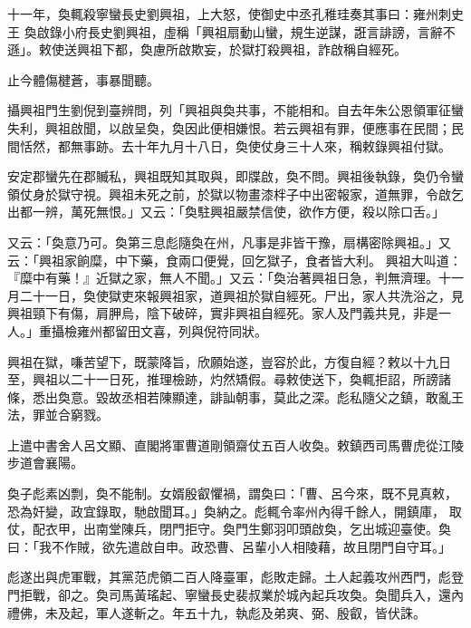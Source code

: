 \begin{pinyinscope}
 十一年，奐輒殺寧蠻長史劉興祖，上大怒，使御史中丞孔稚珪奏其事曰：雍州刺史王
 奐啟錄小府長史劉興祖，虛稱「興祖扇動山蠻，規生逆謀，誑言誹謗，言辭不遜」。敕使送興祖下都，奐慮所啟欺妄，於獄打殺興祖，詐啟稱自經死。



 止今體傷楗蒼，事暴聞聽。



 攝興祖門生劉倪到臺辨問，列「興祖與奐共事，不能相和。自去年朱公恩領軍征蠻失利，興祖啟聞，以啟呈奐，奐因此便相嫌恨。若云興祖有罪，便應事在民間；民間恬然，都無事跡。去十年九月十八日，奐使仗身三十人來，稱敕錄興祖付獄。



 安定郡蠻先在郡贓私，興祖既知其取與，即牒啟，奐不問。興祖後執錄，奐仍令蠻領仗身於獄守視。興祖未死之前，於獄以物畫漆柈子中出密報家，道無罪，令啟乞出都一辨，萬死無恨。」又云：「奐駐興祖嚴禁信使，欲作方便，殺以除口舌。」



 又云：「奐意乃可。奐第三息彪隨奐在州，凡事是非皆干豫，扇構密除興祖。」又云：「興祖家餉糜，中下藥，食兩口便覺，回乞獄子，食者皆大利。
 興祖大叫道：『糜中有藥！』近獄之家，無人不聞。」又云：「奐治著興祖日急，判無濟理。十一月二十一日，奐使獄吏來報興祖家，道興祖於獄自經死。尸出，家人共洗浴之，見興祖頸下有傷，肩胛烏，陰下破碎，實非興祖自經死。家人及門義共見，非是一人。」重攝檢雍州都留田文喜，列與倪符同狀。



 興祖在獄，嗛苦望下，既蒙降旨，欣願始遂，豈容於此，方復自經？敕以十九日至，興祖以二十一日死，推理檢跡，灼然矯假。尋敕使送下，奐輒拒詔，所謗諸條，悉出奐意。毀故丞相若陳顯達，誹訕朝事，莫此之深。彪私隨父之鎮，敢亂王法，罪並合窮戮。



 上遣中書舍人呂文顯、直閣將軍曹道剛領齋仗五百人收奐。敕鎮西司馬曹虎從江陵步道會襄陽。



 奐子彪素凶剽，奐不能制。女婿殷叡懼禍，謂奐曰：「曹、呂今來，既不見真敕，恐為奸變，政宜錄取，馳啟聞耳。」奐納之。彪輒令率州內得千餘人，開鎮庫，
 取仗，配衣甲，出南堂陳兵，閉門拒守。奐門生鄭羽叩頭啟奐，乞出城迎臺使。奐曰：「我不作賊，欲先遣啟自申。政恐曹、呂輩小人相陵藉，故且閉門自守耳。」



 彪遂出與虎軍戰，其黨范虎領二百人降臺軍，彪敗走歸。土人起義攻州西門，彪登門拒戰，卻之。奐司馬黃瑤起、寧蠻長史裴叔業於城內起兵攻奐。奐聞兵入，還內禮佛，未及起，軍人遂斬之。年五十九，執彪及弟爽、弼、殷叡，皆伏誅。




\end{pinyinscope}
